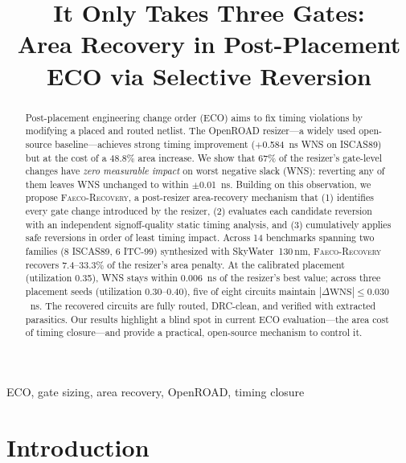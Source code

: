 \documentclass[journal]{IEEEtran}
\begin{document}
\title{It Only Takes Three Gates:\\Area Recovery in Post-Placement ECO via Selective Reversion}

\author{
}

\maketitle

\begin{abstract}
Post-placement engineering change order (ECO) aims to fix timing violations by
modifying a placed and routed netlist. The OpenROAD resizer---a widely used
open-source baseline---achieves strong timing improvement ($+$0.584~ns WNS on
ISCAS89) but at the cost of a 48.8\% area increase. We show that 67\% of the
resizer's gate-level changes have \emph{zero measurable impact} on worst
negative slack (WNS): reverting any of them leaves WNS unchanged to within
$\pm$0.01~ns. Building on this observation, we propose \textsc{Faeco-Recovery},
a post-resizer area-recovery mechanism that (1) identifies every gate change
introduced by the resizer, (2) evaluates each candidate reversion with an
independent signoff-quality static timing analysis, and (3) cumulatively
applies safe reversions in order of least timing impact. Across 14 benchmarks spanning two families (8 ISCAS89, 6 ITC-99)
synthesized with SkyWater~130\,nm, \textsc{Faeco-Recovery} recovers
7.4--33.3\% of the resizer's area penalty. At the calibrated placement
(utilization 0.35), WNS stays within 0.006~ns of the resizer's best
value; across three placement seeds (utilization 0.30--0.40),
five of eight circuits maintain $|\Delta\text{WNS}| \le 0.030$~ns.
The recovered circuits are fully routed, DRC-clean, and verified
with extracted parasitics. Our results highlight a blind spot in
current ECO evaluation---the area cost of timing closure---and
provide a practical, open-source mechanism to control it.
\end{abstract}

\begin{IEEEkeywords}
ECO, gate sizing, area recovery, OpenROAD, timing closure
\end{IEEEkeywords}

\section{Introduction}
\end{document}
